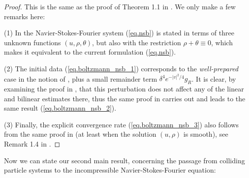 \documentclass[10pt, reqno]{amsart}
\theoremstyle{definition}
\theoremstyle{remark}
\numberwithin{equation}{section}
\begin{document}
\begin{proof} This is the same as the proof of Theorem 1.1 in \cite{GT20}. We only make a few remarks here:

(1) In \cite{GT20} the Navier-Stokes-Fourier system (\ref{eq.nsb}) is stated in terms of three unknown functions $(u,\rho,\theta)$, but also with the restriction $\rho+\theta\equiv 0$, which makes it equivalent to the current formulation (\ref{eq.nsb}).

(2) The initial data (\ref{eq.boltzmann_nsb_1}) corresponds to the \emph{well-prepared} case in the notion of \cite{GT20}, plus a small remainder term $\delta^4 e^{-|v|^2/4}g_R$. It is clear, by examining the proof in \cite{GT20}, that this perturbation does not affect any of the linear and bilinear estimates there, thus the same proof in \cite{GT20} carries out and leads to the same result (\ref{eq.boltzmann_nsb_2}).

(3) Finally, the explicit convergence rate (\ref{eq.boltzmann_nsb_3}) also follows from the same proof in \cite{GT20} (at least when the solution $(u,\rho)$ is smooth), see Remark 1.4 in \cite{GT20}.
\end{proof}
Now we can state our second main result, concerning the passage from colliding particle systems to the incompressible Navier-Stokes-Fourier equation:
\end{document}
